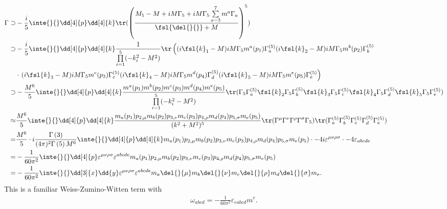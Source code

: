 \begin{align*}
	\Gamma \supset& -\frac{i}{5}\inte{}{}\dd[4]{p}\dd[4]{k}\tr(\left(\frac{M_{1} - M + iM\Gamma_{5} + iM\Gamma_{5}\sum\limits_{a = 3}^{7}m^{a}\Gamma_{a}}{\fsl{\del{}{}} + M}\right)^{5}) \\
	       \supset& -\frac{i}{5}\inte{}{}\dd[4]{p}\dd[4]{k}\frac{1}{\prod\limits_{i = 1}^{5}(-k_{i}^{2} - M^{2})}\tr\left((i\fsl{k}_{1} - M)iM\Gamma_{5}m^{a}(p_{1})\Gamma_{a}^{(5)}(i\fsl{k}_{2} - M)iM\Gamma_{5}m^{b}(p_{2})\Gamma_{b}^{(5)} \right. \\
	              &\cdot \left. (i\fsl{k}_{3} - M)iM\Gamma_{5}m^{c}(p_{3})\Gamma_{c}^{(5)}(i\fsl{k}_{4} - M)iM\Gamma_{5}m^{d}(p_{4})\Gamma_{d}^{(5)}(i\fsl{k}_{5} - M)iM\Gamma_{5}m^{e}(p_{5})\Gamma_{e}^{(5)}\right) \\
	\supset& -\frac{M^{6}}{5}\inte{}{}\dd[4]{p}\dd[4]{k}\frac{m^{a}(p_{1})m^{b}(p_{2})m^{c}(p_{3})m^{d}(p_{4})m^{e}(p_{5})}{\prod\limits_{i = 1}^{5}(-k_{i}^{2} - M^{2})}\tr(\Gamma_{5}\Gamma_{a}^{(5)}\fsl{k}_{2}\Gamma_{5}\Gamma_{b}^{(5)}\fsl{k}_{3}\Gamma_{5}\Gamma_{c}^{(5)}\fsl{k}_{4}\Gamma_{5}\Gamma_{d}^{(5)}\fsl{k}_{5}\Gamma_{5}\Gamma_{e}^{(5)}) \\
	\approx& \frac{M^{6}}{5}\inte{}{}\dd[4]{p}\dd[4]{k}\frac{m_{a}(p_{1})p_{2, \mu}m_{b}(p_{2})p_{3, \nu}m_{c}(p_{3})p_{4, \rho}m_{d}(p_{4})p_{5, \sigma}m_{e}(p_{5})}{(k^{2} + M^{2})^{5}}\tr(\Gamma^{\mu}\Gamma^{\nu}\Gamma^{\rho}\Gamma^{\sigma}\Gamma_{5})\tr(\Gamma_{a}^{(5)}\Gamma_{b}^{(5)}\Gamma_{c}^{(5)}\Gamma_{d}^{(5)}\Gamma_{e}^{(5)}) \\
	      =& \frac{M^{6}}{5}\cdot i\frac{\Gamma\left(3\right)}{(4\pi)^{2}\Gamma\left(5\right)M^{6}}\inte{}{}\dd[4]{p}\dd[4]{k}m_{a}(p_{1})p_{2, \mu}m_{b}(p_{2})p_{3, \nu}m_{c}(p_{3})p_{4, \rho}m_{d}(p_{4})p_{5, \sigma}m_{e}(p_{5})\cdot -4i\varepsilon^{\mu\nu\rho\sigma}\cdot -4\varepsilon_{abcde} \\
	      =& -\frac{1}{60\pi^{2}}\inte{}{}\dd[4]{p}\varepsilon^{\mu\nu\rho\sigma}\varepsilon^{abcde}m_{a}(p_{1})p_{2, \mu}m_{b}(p_{2})p_{3, \nu}m_{c}(p_{3})p_{4, \rho}m_{d}(p_{4})p_{5, \sigma}m_{e}(p_{5}) \\
	      =& -\frac{1}{60\pi^{2}}\inte{}{}\dd[3]{x}\dd{y}\varepsilon^{\mu\nu\rho\sigma}\varepsilon^{abcde}m_{a}\del{}{\mu}m_{b}\del{}{\nu}m_{c}\del{}{\rho}m_{d}\del{}{\sigma}m_{e}.
\end{align*}
This is a familiar Weiss-Zumino-Witten term with
\begin{align*}
	\omega_{abcd} = -\frac{1}{60\pi^{2}}\varepsilon_{eabcd}m^{e}.
\end{align*}

